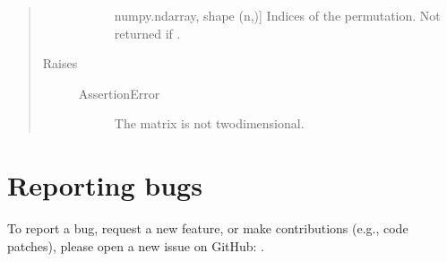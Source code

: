 \documentclass[letterpaper,10pt,english]{sphinxmanual}
\begin{document}
\begin{fulllineitems}
\begin{quote}
\begin{description}
\begin{description}
\item[{}] \leavevmode{[}numpy.ndarray, shape (n,){]}
\sphinxAtStartPar
Indices of the permutation. Not returned if .

\end{description}

\item[{Raises}] \leavevmode\begin{description}
\item[{AssertionError}] \leavevmode
\sphinxAtStartPar
The matrix  is not two\sphinxhyphen{}dimensional.

\end{description}

\end{description}\end{quote}

\end{fulllineitems}



\chapter{Reporting bugs}
\label{\detokenize{bugs:reporting-bugs}}\label{\detokenize{bugs::doc}}
\sphinxAtStartPar
To report a bug, request a new feature, or make contributions
(e.g., code patches), please open a new issue on GitHub:
.
\end{document}
